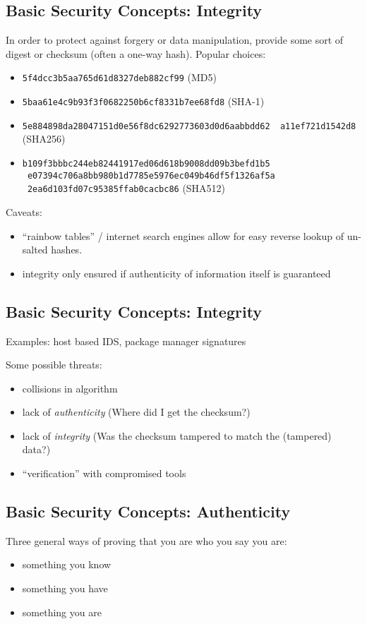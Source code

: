 \documentclass[xga]{xdvislides}
\begin{document}
\subsection{Basic Security Concepts: Integrity}
In order to protect against forgery or data manipulation, provide some sort of
digest or checksum (often a one-way hash).  Popular choices:

\begin{itemize}
	\item {\tt 5f4dcc3b5aa765d61d8327deb882cf99} (MD5)
	\item {\tt 5baa61e4c9b93f3f0682250b6cf8331b7ee68fd8} (SHA-1)
	\item {\tt 5e884898da28047151d0e56f8dc6292773603d0d6aabbdd62 \
                   a11ef721d1542d8} (SHA256)
	\item {\tt b109f3bbbc244eb82441917ed06d618b9008dd09b3befd1b5 \
                   e07394c706a8bb980b1d7785e5976ec049b46df5f1326af5a \
                   2ea6d103fd07c95385ffab0cacbc86} (SHA512)
\end{itemize}


Caveats:
\begin{itemize}
	\item ``rainbow tables'' / internet search engines allow for easy reverse
		lookup of un-salted hashes.
	\item integrity only ensured if authenticity of information itself is
		guaranteed
\end{itemize}

\subsection{Basic Security Concepts: Integrity}
Examples: host based IDS, package manager signatures

\vspace{.5in}
Some possible threats:
\begin{itemize}
	\item collisions in algorithm
	\item lack of {\em authenticity} (Where did I get the checksum?)
	\item lack of {\em integrity} (Was the checksum tampered to match the (tampered) data?)
	\item ``verification'' with compromised tools
\end{itemize}

\subsection{Basic Security Concepts: Authenticity}
Three general ways of proving that you are who you say you are:
\begin{itemize}
	\item something you know
	\item something you have
	\item something you are
\end{itemize}
\end{document}
